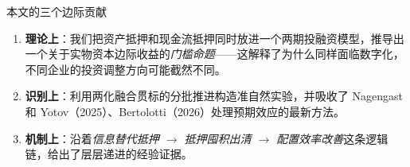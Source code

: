 \begin{frame}{本文的三个边际贡献}
  \begin{enumerate}
    \item \textbf{理论上}：我们把资产抵押和现金流抵押同时放进一个两期投融资模型，推导出一个关于实物资本边际收益的\emph{门槛命题}——这解释了为什么同样面临数字化，不同企业的投资调整方向可能截然不同。
    \item \textbf{识别上}：利用两化融合贯标的分批推进构造准自然实验，并吸收了 Nagengast 和 Yotov（2025）、Bertolotti（2026）处理预期效应的最新方法。
    \item \textbf{机制上}：沿着\emph{信息替代抵押 $\rightarrow$ 抵押囤积出清 $\rightarrow$ 配置效率改善}这条逻辑链，给出了层层递进的经验证据。
  \end{enumerate}
\end{frame}
